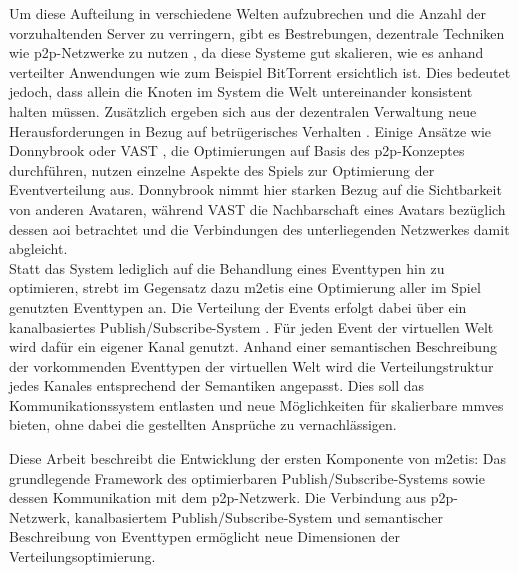 Um diese Aufteilung in verschiedene Welten aufzubrechen und die Anzahl der vorzuhaltenden Server zu verringern, gibt es Bestrebungen, dezentrale Techniken wie \ac{p2p}-Netzwerke zu nutzen \cite{Knutsson2004Peertopeer, Triebel2008Peertopeer}, da diese Systeme gut skalieren, wie es anhand verteilter Anwendungen wie zum Beispiel BitTorrent ersichtlich ist. Dies bedeutet jedoch, dass allein die Knoten im System die Welt untereinander konsistent halten müssen. Zusätzlich ergeben sich aus der dezentralen Verwaltung neue Herausforderungen in Bezug auf betrügerisches Verhalten \cite{Kabus2007Design}. Einige Ansätze wie Donnybrook \cite{Bharambe2008Donnybrook} oder VAST \cite{Backhaus2007Voronoibased}, die Optimierungen auf Basis des \ac{p2p}-Konzeptes durchführen, nutzen einzelne Aspekte des Spiels zur Optimierung der Eventverteilung aus. Donnybrook nimmt hier starken Bezug auf die Sichtbarkeit von anderen Avataren, während VAST die Nachbarschaft eines Avatars bezüglich dessen \ac{aoi} betrachtet und die Verbindungen des unterliegenden Netzwerkes damit abgleicht.\\
Statt das System lediglich auf die Behandlung eines Eventtypen hin zu optimieren, strebt im Gegensatz dazu \ac{m2etis} eine Optimierung aller im Spiel genutzten Eventtypen an. Die Verteilung der Events erfolgt dabei über ein kanalbasiertes Publish/Subscribe-System \cite{Fischer2010a}. Für jeden Event der virtuellen Welt wird dafür ein eigener Kanal genutzt. Anhand einer semantischen Beschreibung der vorkommenden Eventtypen der virtuellen Welt wird die Verteilungstruktur jedes Kanales entsprechend der Semantiken angepasst. Dies soll das Kommunikationssystem entlasten und neue Möglichkeiten für skalierbare \acp{mmve} bieten, ohne dabei die gestellten Ansprüche zu vernachlässigen.

Diese Arbeit beschreibt die Entwicklung der ersten Komponente von \ac{m2etis}: Das grundlegende Framework des optimierbaren Publish/Subscribe-Systems sowie dessen Kommunikation mit dem \ac{p2p}-Netzwerk. Die Verbindung aus \ac{p2p}-Netzwerk, kanalbasiertem Publish/Subscribe-System und semantischer Beschreibung von Eventtypen ermöglicht neue Dimensionen der Verteilungsoptimierung.

